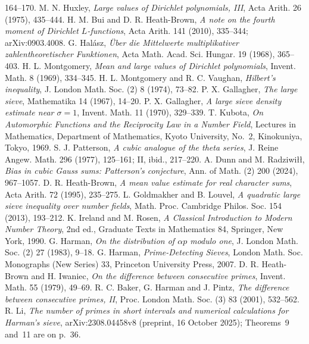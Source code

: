   164--170.
 M. N. Huxley, \emph{Large values of Dirichlet polynomials, III}, Acta Arith. 26 (1975), 435--444.
 H. M. Bui and D. R. Heath-Brown, \emph{A note on the fourth moment of Dirichlet $L$-functions},
  Acta Arith. 141 (2010), 335--344; arXiv:0903.4008.
 G. Hal\'asz, \emph{\"Uber die Mittelwerte multiplikativer zahlentheoretischer Funktionen}, Acta Math.
  Acad. Sci. Hungar. 19 (1968), 365--403.
 H. L. Montgomery, \emph{Mean and large values of Dirichlet polynomials}, Invent. Math. 8
  (1969), 334--345.
 H. L. Montgomery and R. C. Vaughan, \emph{Hilbert's inequality}, J. London Math. Soc.
  (2) 8 (1974), 73--82.
 P. X. Gallagher, \emph{The large sieve}, Mathematika 14 (1967), 14--20.
 P. X. Gallagher, \emph{A large sieve density estimate near $\sigma = 1$}, Invent. Math. 11
  (1970), 329--339.
 T. Kubota, \emph{On Automorphic Functions and the Reciprocity Law in a Number Field}, Lectures in
  Mathematics, Department of Mathematics, Kyoto University, No.~2, Kinokuniya, Tokyo, 1969.
 S. J. Patterson, \emph{A cubic analogue of the theta series}, J. Reine Angew. Math. 296 (1977),
  125--161; II, ibid., 217--220.
 A. Dunn and M. Radziwi\l\l, \emph{Bias in cubic Gauss sums: Patterson's conjecture}, Ann. of
  Math. (2) 200 (2024), 967--1057.
 D. R. Heath-Brown, \emph{A mean value estimate for real character sums}, Acta Arith. 72 (1995),
  235--275.
 L. Goldmakher and B. Louvel, \emph{A quadratic large sieve inequality over number fields},
  Math. Proc. Cambridge Philos. Soc. 154 (2013), 193--212.
 K. Ireland and M. Rosen, \emph{A Classical Introduction to Modern Number Theory}, 2nd ed.,
  Graduate Texts in Mathematics 84, Springer, New York, 1990.
 G. Harman, \emph{On the distribution of $\alpha p$ modulo one}, J. London Math. Soc. (2) 27 (1983),
  9--18.
 G. Harman, \emph{Prime-Detecting Sieves}, London Math. Soc. Monographs (New Series) 33, Princeton
  University Press, 2007.
 D. R. Heath-Brown and H. Iwaniec, \emph{On the difference between consecutive primes}, Invent.
  Math. 55 (1979), 49--69.
 R. C. Baker, G. Harman and J. Pintz, \emph{The difference between consecutive primes, II}, Proc. London
  Math. Soc. (3) 83 (2001), 532--562.
 R. Li, \emph{The number of primes in short intervals and numerical calculations for Harman's
  sieve}, arXiv:2308.04458v8 (preprint, 16 October 2025); Theorems~9 and~11 are on p.~36.
